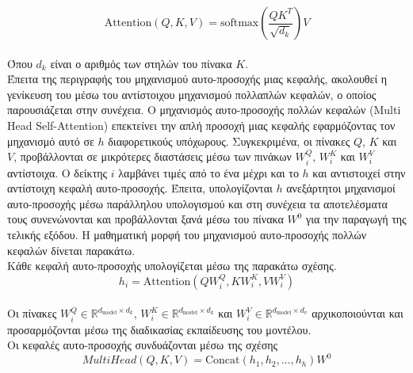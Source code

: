 \documentclass[12pt]{article}
\numberwithin{equation}{section}
\begin{document}
\begin{equation}
\text{Attention}(Q, K, V) = \text{softmax}\left( \frac{QK^T}{\sqrt{d_k}} \right) V
\end{equation}\\

\noindent Όπου \(d_k\) είναι ο αριθμός των στηλών του πίνακα \(K\).\\

Έπειτα της περιγραφής του μηχανισμού αυτο-προσοχής μιας κεφαλής, ακολουθεί η γενίκευση του μέσω του αντίστοιχου μηχανισμού πολλαπλών κεφαλών, ο οποίος παρουσιάζεται στην συνέχεια. Ο μηχανισμός αυτο-προσοχής πολλών κεφαλών (Multi Head Self-Attention) επεκτείνει την απλή προσοχή μιας κεφαλής εφαρμόζοντας τον μηχανισμό αυτό σε \(h\) διαφορετικούς υπόχωρους. Συγκεκριμένα, οι πίνακες \(Q\), \(K\) και \(V\), προβάλλονται σε μικρότερες διαστάσεις μέσω των πινάκων \(W_i^Q\), \(W_i^K\) και \(W_i^V\) αντίστοιχα. Ο δείκτης \(i\) λαμβάνει τιμές από το ένα μέχρι και το \(h\) και αντιστοιχεί στην αντίστοιχη κεφαλή αυτο-προσοχής. Έπειτα, υπολογίζονται \(h\) ανεξάρτητοι μηχανισμοί αυτο-προσοχής μέσω παράλληλου υπολογισμού και στη συνέχεια τα αποτελέσματα τους συνενώνονται και προβάλλονται ξανά μέσω του πίνακα \(W^0\) για την παραγωγή της τελικής εξόδου. Η μαθηματική μορφή του μηχανισμού αυτο-προσοχής πολλών κεφαλών δίνεται παρακάτω.\\

\noindent Κάθε κεφαλή αυτο-προσοχής υπολογίζεται μέσω της παρακάτω σχέσης.\\


\begin{equation}
h_i = \text{Attention}(QW_i^Q, KW_i^K, VW_i^V)
\end{equation}\\

\noindent Οι πίνακες \( W_i^Q \in \mathbb{R}^{d_{\text{model}} \times d_k} \), \( W_i^K \in \mathbb{R}^{d_{\text{model}} \times d_k} \) και \( W_i^V \in \mathbb{R}^{d_{\text{model}} \times d_v} \) αρχικοποιούνται και προσαρμόζονται μέσω της διαδικασίας εκπαίδευσης του μοντέλου.\\

\noindent Οι κεφαλές αυτο-προσοχής συνδυάζονται μέσω της σχέσης\\

\begin{equation}
MultiHead(Q, K, V) = \text{Concat}(h_1, h_2, \ldots, h_h) W^0
\end{equation}\\
\end{document}
